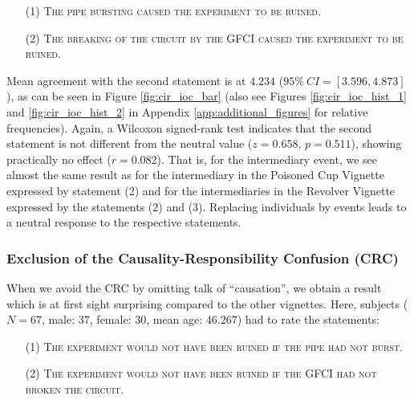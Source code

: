 \documentclass[egregdoesnotlikesansseriftitles,12pt]{scrartcl}
\begin{document}
\begin{itemize}
   \item[(1)]\textsc{The pipe bursting caused the experiment to be ruined.}
   \item[(2)]\textsc{The breaking of the circuit by the GFCI caused the experiment to be ruined.}
\end{itemize}

\noindent Mean agreement with the second statement is at $4.234$ ($95\%~CI=[3.596,4.873]$), as can be seen in Figure \ref{fig:cir_ioc_bar} (also see Figures \ref{fig:cir_ioc_hist_1} and \ref{fig:cir_ioc_hist_2} in Appendix \ref{app:additional_figures} for relative frequencies). Again, a Wilcoxon signed-rank test indicates that the second statement is not different from the neutral value ($z=0.658$, $p=0.511$), showing practically no effect ($r=0.082$). That is, for the intermediary event, we see almost the same result as for the intermediary in the Poisoned Cup Vignette expressed by statement (2) and for the intermediaries in the Revolver Vignette expressed by the statements (2) and (3). Replacing individuals by events leads to a neutral response to the respective statements.

\subsubsection{Exclusion of the Causality-Responsibility Confusion (CRC)}\label{sec:results_cir_crc}
When we avoid the CRC by omitting talk of ``causation'', we obtain a result which is at first sight surprising compared to the other vignettes. Here, subjects ($N=67$, male: $37$, female: $30$, mean age: $46.267$) had to rate the statements:

\begin{itemize}
   \item[(1)]\textsc{The experiment would not have been ruined if the pipe had not burst.}
   \item[(2)]\textsc{The experiment would not have been ruined if the GFCI had not broken the circuit.}
\end{itemize}
\end{document}
